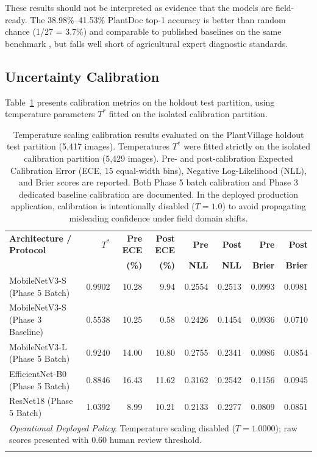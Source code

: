 \documentclass[pdflatex,sn-mathphys-num]{sn-jnl}
\theoremstyle{thmstyleone}%
\theoremstyle{thmstyletwo}%
\theoremstyle{thmstylethree}%
\begin{document}
These results should not be interpreted as evidence that the models are field-ready.
The 38.98\%--41.53\% PlantDoc top-1 accuracy is better than random chance (1/27 = 3.7\%)
and comparable to published baselines on the same benchmark
\citep{singh2020plant,dsouza2023generalization}, but falls well short of agricultural expert diagnostic standards.

\subsection{Uncertainty Calibration}
\label{sec:results_calibration}

Table~\ref{tab:calibration_results} presents calibration metrics on the holdout test
partition, using temperature parameters $T^*$ fitted on the isolated calibration
partition.

\begin{table}[htbp]
\caption{Temperature scaling calibration results evaluated on the PlantVillage holdout test partition (5{,}417 images). Temperatures $T^*$ were fitted strictly on the isolated calibration partition (5{,}429 images). Pre- and post-calibration Expected Calibration Error (ECE, 15 equal-width bins), Negative Log-Likelihood (NLL), and Brier scores are reported. Both Phase 5 batch calibration and Phase 3 dedicated baseline calibration are documented. In the deployed production application, calibration is intentionally disabled ($T=1.0$) to avoid propagating misleading confidence under field domain shifts.}\label{tab:calibration_results}%
\footnotesize
\setlength{\tabcolsep}{2pt}%
\begin{tabular*}{\textwidth}{@{\extracolsep\fill}lrrrrrrr}
\toprule
\textbf{Architecture / Protocol} & $T^*$ & \textbf{Pre ECE} & \textbf{Post ECE} & \textbf{Pre} & \textbf{Post} & \textbf{Pre} & \textbf{Post} \\
& & \textbf{(\%)} & \textbf{(\%)} & \textbf{NLL} & \textbf{NLL} & \textbf{Brier} & \textbf{Brier} \\
\midrule
MobileNetV3-S (Phase 5 Batch)    & 0.9902 & 10.28 &  9.94 & 0.2554 & 0.2513 & 0.0993 & 0.0981 \\
MobileNetV3-S (Phase 3 Baseline) & 0.5538 & 10.25 &  0.58 & 0.2426 & 0.1454 & 0.0936 & 0.0710 \\
MobileNetV3-L (Phase 5 Batch)    & 0.9240 & 14.00 & 10.80 & 0.2755 & 0.2341 & 0.0986 & 0.0854 \\
EfficientNet-B0 (Phase 5 Batch)  & 0.8846 & 16.43 & 11.62 & 0.3162 & 0.2542 & 0.1156 & 0.0945 \\
ResNet18 (Phase 5 Batch)         & 1.0392 &  8.99 & 10.21 & 0.2133 & 0.2277 & 0.0809 & 0.0851 \\
\midrule
\multicolumn{8}{p{0.96\textwidth}}{\textit{Operational Deployed Policy}: Temperature scaling disabled ($T=1.0000$); raw scores presented with 0.60 human review threshold.} \\
\botrule
\end{tabular*}
\end{table}
\end{document}
